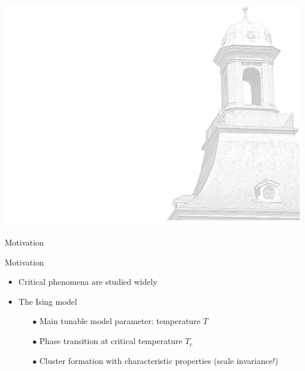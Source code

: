 \documentclass[xcolor=dvipsnames]{beamer}
\newcommand{\myitemsep}{\setlength\itemsep{0.33cm}}
\newcommand{\mysubitemsep}{\setlength\itemsep{0.22cm}}
\begin{document}
    {\usebackgroundtemplate%
        {%
            \includegraphics[width=\paperwidth,height=\paperheight]{bkg1.pdf}%
        }
        \begin{frame}
            \centering \Huge \color{ublue} Motivation
            \thispagestyle{empty}
            \addtocounter{framenumber}{-1}
        \end{frame}
    }
    
    \begin{frame}[t]{Motivation}
        \begin{itemize}\myitemsep
            \item<1-> Critical phenomena are studied widely
            \item<2-> The Ising model%
            \begin{itemize}\mysubitemsep
                \item[$\bullet$] Main tunable model parameter: temperature $T$
                \item[$\bullet$] Phase transition at critical temperature $T_{\mathrm{c}}$
                \item[$\bullet$] Cluster formation with characteristic properties (scale invariance!)
            \end{itemize}
        \end{itemize}
    \end{frame}
\end{document}
